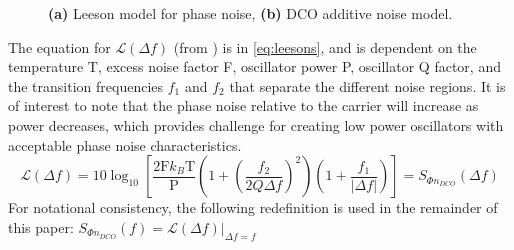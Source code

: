 	\begin{figure}[htb!]
	    \centering
	    \begin{subfigure}{0.45\textwidth}
	        \centering
			
			\caption{ }
			\label{fig:leeson_pn}
	    \end{subfigure}
	    \begin{subfigure}{0.5\textwidth}
	        \centering
			
			\caption{ }
			\label{fig:dco_noise}
	    \end{subfigure}%
	    \label{fig:osc_pn_figs}
	    \caption{\textbf{(a)} Leeson model for phase noise, \textbf{(b)} DCO additive noise model.}
	\end{figure}
	\FloatBarrier
	The equation for $\mathcal{L}(\Delta f)$ (from \cite{lee_hajimiri_2000}) is in \ref{eq:leesons}, and is dependent on the temperature T, excess noise factor F, oscillator power P, oscillator Q factor, and the transition frequencies $f_1$ and $f_2$ that separate the different noise regions. It is of interest to note that the phase noise relative to the carrier will increase as power decreases, which provides challenge for creating low power oscillators with acceptable phase noise characteristics.
	\begin{equation}\label{eq:leesons}
	\mathcal{L}(\Delta f) = 10\log_{10}\left[\frac{2\text{F}k_B\text{T}}{\text{P}}\left(1+\left(\frac{f_2}{2Q\Delta f}\right)^2\right)\left(1+\frac{f_1}{|\Delta f|}\right)\right] = S_{\Phi n_{DCO}}(\Delta f)
	\end{equation}
	For notational consistency, the following redefinition is used in the remainder of this paper: $S_{\Phi n_{DCO}}(f) = \mathcal{L}(\Delta f)|_{\Delta f = f}$


